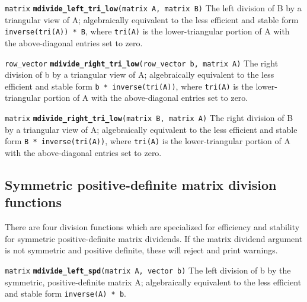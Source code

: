 \documentclass[
  10pt,
]{book}
\begin{document}
\texttt{matrix} \textbf{\texttt{mdivide\_left\_tri\_low}}\texttt{(matrix\ A,\ matrix\ B)}\newline
The left division of B by a triangular view of A; algebraically
equivalent to the less efficient and stable form \texttt{inverse(tri(A))\ *\ B}, where \texttt{tri(A)} is the lower-triangular portion of A with the
above-diagonal entries set to zero.


\texttt{row\_vector} \textbf{\texttt{mdivide\_right\_tri\_low}}\texttt{(row\_vector\ b,\ matrix\ A)}\newline
The right division of b by a triangular view of A; algebraically
equivalent to the less efficient and stable form \texttt{b\ *\ inverse(tri(A))}, where \texttt{tri(A)} is the lower-triangular portion of A
with the above-diagonal entries set to zero.


\texttt{matrix} \textbf{\texttt{mdivide\_right\_tri\_low}}\texttt{(matrix\ B,\ matrix\ A)}\newline
The right division of B by a triangular view of A; algebraically
equivalent to the less efficient and stable form \texttt{B\ *\ inverse(tri(A))}, where \texttt{tri(A)} is the lower-triangular portion of A
with the above-diagonal entries set to zero.

\hypertarget{symmetric-positive-definite-matrix-division-functions}{%
\subsection{Symmetric positive-definite matrix division functions}\label{symmetric-positive-definite-matrix-division-functions}}

There are four division functions which are specialized for efficiency
and stability for symmetric positive-definite matrix dividends. If
the matrix dividend argument is not symmetric and positive definite,
these will reject and print warnings.


\texttt{matrix} \textbf{\texttt{mdivide\_left\_spd}}\texttt{(matrix\ A,\ vector\ b)}\newline
The left division of b by the symmetric, positive-definite matrix A;
algebraically equivalent to the less efficient and stable form
\texttt{inverse(A)\ *\ b}.
\end{document}
